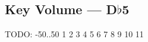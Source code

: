 \subsection{Key Volume --- D$\flat$5}









































TODO: -50..50
1
2
3
4
5
6
7
8
9
10
11
